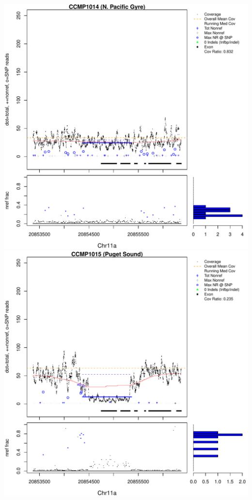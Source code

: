 \documentclass{article}\usepackage[]{graphicx}\usepackage[]{color}
\makeatletter
\def\maxwidth{ %
  \ifdim\Gin@nat@width>\linewidth
    \linewidth
  \else
    \Gin@nat@width
  \fi
}
\newenvironment{knitrout}{}{} %
\makeatother
\begin{document}
\begin{knitrout}
{\includegraphics[width=\maxwidth]{figs-knitr/unnamed-chunk-51-5} 
\includegraphics[width=\maxwidth]{figs-knitr/unnamed-chunk-51-6} 
}
\end{knitrout}
\end{document}
